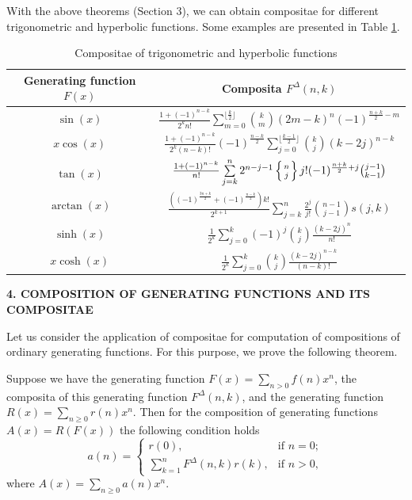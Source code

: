 \documentclass[12pt]{article}
\begin{document}
With the above theorems (Section 3), we can obtain compositae for different trigonometric and hyperbolic functions. Some examples are presented in Table \ref{Tabl3_compositae}.

\begin{table}[h]
\begin{center}
\setlength\arrayrulewidth{1pt}
\renewcommand{\arraystretch}{1,3}
\begin{tabular}{|c|c|}
\hline
\textbf{Generating function $F(x)$}&  \textbf{Composita $F^{\Delta}(n,k)$}\\
\hline
$\sin(x)$ & $\frac{1+(-1)^{n-k}}{2^{k}n!}\sum\limits_{m=0}^{\lfloor \frac{k}{2} \rfloor} {k \choose m} (2m-k)^n(-1)^{\frac{n+k}{2}-m}
$\\ \hline
$x\cos(x)$ &$\frac{1+(-1)^{n-k}}{2^{k}(n-k)!}(-1)^{\frac{n-k}{2}}\sum\limits_{j=0}^{ \lfloor\frac{k-1}{2} \rfloor} {k \choose j}(k-2j)^{n-k}$\\  \hline
$\tan(x)$ &$
\frac{1+(-1)^{n-k}}{n!}\sum\limits_{j=k}^n 2^{n-j-1}\left\{{n \atop j}\right\}j!(-1)^{\frac{n+k}{2}+j}{j-1 \choose k-1}
$ \\  \hline
$\arctan(x)$ & $
\frac{\left((-1)^{\frac{3n+k}{2}}+(-1)^\frac{n-k}{2}\right)k!}{2^{k+1}}\sum\limits_{j=k}^n \frac{2^j}{j!}{n-1 \choose j-1}s(j,k)
$ \\ \hline
$\sinh(x)$ & $\frac{1}{2^k}\sum\limits_{j=0}^k (-1)^j{k\choose j} \frac{(k-2j)^n}{n!}$ \\ \hline
$x\cosh(x)$ & $\frac{1}{2^k}\sum\limits_{j=0}^k {k\choose j} \frac{(k-2j)^{n-k}}{(n-k)!}$ \\ \hline
\end{tabular}
\caption{Compositae of trigonometric and hyperbolic functions}
\label{Tabl3_compositae}
\end{center}
\end{table}

\vspace{1.5cc}
\begin{center}
{\bf 4. COMPOSITION OF GENERATING FUNCTIONS AND ITS COMPOSITAE}
\end{center}

Let us consider the application of compositae for computation of compositions of ordinary generating functions. For this purpose, we prove the following theorem.
\begin{theorem}
\label{Theorem_composition}
Suppose we have the generating function $F(x)=\sum_{n>0} f(n)x^n$, the composita of this generating function $F^{\Delta}(n,k)$, and the generating function $R(x)=\sum_{n\geq 0} r(n)x^n$. 
Then for the composition of generating functions $ A(x)=R(F(x))$ the following condition holds
\begin{equation}
\label{composition}
a(n)=\begin{cases}
r(0), & \text{if $n=0$};\\
\sum_{k=1}^n F^{\Delta}(n,k)r(k), & \text{if $n>0$},
\end{cases}
\end{equation}
where $A(x)=\sum_{n\geq 0} a(n)x^n.$
\end{theorem}
\end{document}
